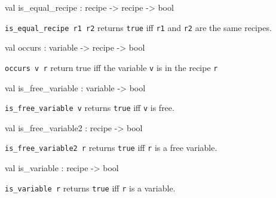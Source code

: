\label{val:Recipe.is-underscoreequal-underscorerecipe}\begin{ocamldoccode}
val is_equal_recipe : recipe -> recipe -> bool
\end{ocamldoccode}
\begin{ocamldocdescription}
{\tt{is\_equal\_recipe r1 r2}} returns {\tt{true}} iff {\tt{r1}} and {\tt{r2}} are the same recipes.


\end{ocamldocdescription}




\label{val:Recipe.occurs}\begin{ocamldoccode}
val occurs : variable -> recipe -> bool
\end{ocamldoccode}
\begin{ocamldocdescription}
{\tt{occurs v r}} return true iff the variable {\tt{v}} is in the recipe {\tt{r}}


\end{ocamldocdescription}




\label{val:Recipe.is-underscorefree-underscorevariable}\begin{ocamldoccode}
val is_free_variable : variable -> bool
\end{ocamldoccode}
\begin{ocamldocdescription}
{\tt{is\_free\_variable v}} returns {\tt{true}} iff {\tt{v}} is free.


\end{ocamldocdescription}




\label{val:Recipe.is-underscorefree-underscorevariable2}\begin{ocamldoccode}
val is_free_variable2 : recipe -> bool
\end{ocamldoccode}
\begin{ocamldocdescription}
{\tt{is\_free\_variable2 r}} returns {\tt{true}} iff {\tt{r}} is a free variable.


\end{ocamldocdescription}




\label{val:Recipe.is-underscorevariable}\begin{ocamldoccode}
val is_variable : recipe -> bool
\end{ocamldoccode}
\begin{ocamldocdescription}
{\tt{is\_variable r}} returns {\tt{true}} iff {\tt{r}} is a variable.


\end{ocamldocdescription}




